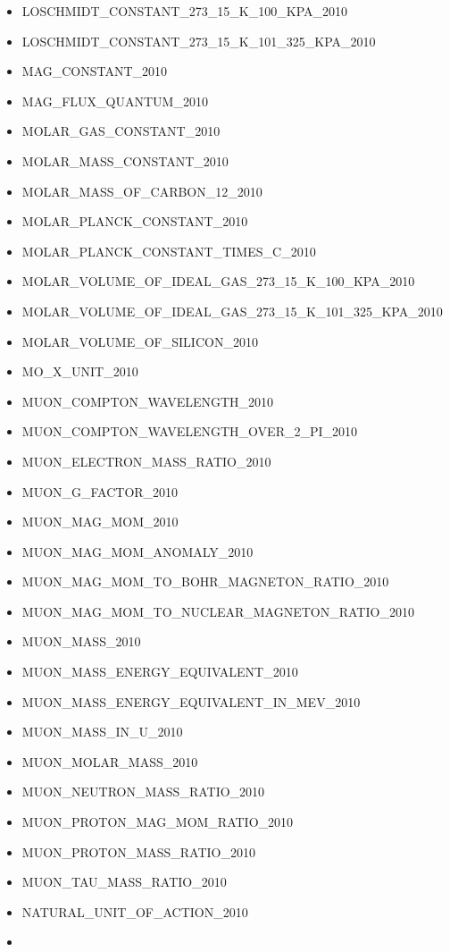 \begin{itemize}
\item
  LOSCHMIDT\_CONSTANT\_273\_15\_K\_100\_KPA\_2010
\item
  LOSCHMIDT\_CONSTANT\_273\_15\_K\_101\_325\_KPA\_2010
\item
  MAG\_CONSTANT\_2010
\item
  MAG\_FLUX\_QUANTUM\_2010
\item
  MOLAR\_GAS\_CONSTANT\_2010
\item
  MOLAR\_MASS\_CONSTANT\_2010
\item
  MOLAR\_MASS\_OF\_CARBON\_12\_2010
\item
  MOLAR\_PLANCK\_CONSTANT\_2010
\item
  MOLAR\_PLANCK\_CONSTANT\_TIMES\_C\_2010
\item
  MOLAR\_VOLUME\_OF\_IDEAL\_GAS\_273\_15\_K\_100\_KPA\_2010
\item
  MOLAR\_VOLUME\_OF\_IDEAL\_GAS\_273\_15\_K\_101\_325\_KPA\_2010
\item
  MOLAR\_VOLUME\_OF\_SILICON\_2010
\item
  MO\_X\_UNIT\_2010
\item
  MUON\_COMPTON\_WAVELENGTH\_2010
\item
  MUON\_COMPTON\_WAVELENGTH\_OVER\_2\_PI\_2010
\item
  MUON\_ELECTRON\_MASS\_RATIO\_2010
\item
  MUON\_G\_FACTOR\_2010
\item
  MUON\_MAG\_MOM\_2010
\item
  MUON\_MAG\_MOM\_ANOMALY\_2010
\item
  MUON\_MAG\_MOM\_TO\_BOHR\_MAGNETON\_RATIO\_2010
\item
  MUON\_MAG\_MOM\_TO\_NUCLEAR\_MAGNETON\_RATIO\_2010
\item
  MUON\_MASS\_2010
\item
  MUON\_MASS\_ENERGY\_EQUIVALENT\_2010
\item
  MUON\_MASS\_ENERGY\_EQUIVALENT\_IN\_MEV\_2010
\item
  MUON\_MASS\_IN\_U\_2010
\item
  MUON\_MOLAR\_MASS\_2010
\item
  MUON\_NEUTRON\_MASS\_RATIO\_2010
\item
  MUON\_PROTON\_MAG\_MOM\_RATIO\_2010
\item
  MUON\_PROTON\_MASS\_RATIO\_2010
\item
  MUON\_TAU\_MASS\_RATIO\_2010
\item
  NATURAL\_UNIT\_OF\_ACTION\_2010
\item

\end{itemize}
